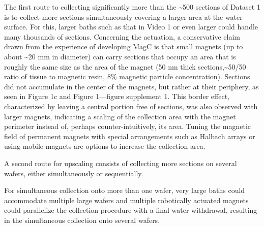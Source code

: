 \documentclass{article}
\begin{document}
The first route to collecting significantly more than the \textasciitilde500 sections of Dataset 1 is to collect more sections simultaneously covering a larger area at the water surface. For this, larger baths such as that in Video 1 or even larger could handle many thousands of sections. Concerning the actuation, a conservative claim drawn from the experience of developing MagC is that small magnets (up to about \textasciitilde20 mm in diameter) can carry sections that occupy an area that is roughly the same size as the area of the magnet (50 nm thick sections,\textasciitilde50/50 ratio of tissue to magnetic resin, 8\% magnetic particle concentration). Sections did not accumulate in the center of the magnets, but rather at their periphery, as seen in Figure 1c and Figure 1---figure supplement 1. This border effect, characterized by leaving a central portion free of sections, was also observed with larger magnets, indicating a scaling of the collection area with the magnet perimeter instead of, perhaps counter-intuitively, its area. Tuning the magnetic field of permanent magnets with special arrangements such as Halbach arrays or using mobile magnets are options to increase the collection area.

A second route for upscaling consists of collecting more sections on several wafers, either simultaneously or sequentially.

For simultaneous collection onto more than one wafer, very large baths could accommodate multiple large wafers and multiple robotically actuated magnets could parallelize the collection procedure with a final water withdrawal, resulting in the simultaneous collection onto several wafers.
\end{document}
